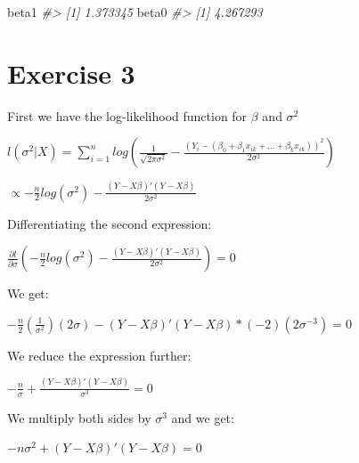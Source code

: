 \documentclass[]{article}
\newenvironment{Shaded}{\begin{snugshade}}{\end{snugshade}}
\newcommand{\CommentTok}[1]{\textcolor[rgb]{0.56,0.35,0.01}{\textit{#1}}}
\newcommand{\KeywordTok}[1]{\textcolor[rgb]{0.13,0.29,0.53}{\textbf{#1}}}
\newcommand{\NormalTok}[1]{#1}
\newcommand{\OperatorTok}[1]{\textcolor[rgb]{0.81,0.36,0.00}{\textbf{#1}}}
\newcommand{\StringTok}[1]{\textcolor[rgb]{0.31,0.60,0.02}{#1}}
\begin{document}
\begin{Shaded}
\end{Shaded}

\begin{Shaded}
\begin{Highlighting}[]
\NormalTok{beta1}
\CommentTok{#> [1] 1.373345}
\NormalTok{beta0}
\CommentTok{#> [1] 4.267293}
\end{Highlighting}
\end{Shaded}

\hypertarget{exercise-3}{%
\section{Exercise 3}\label{exercise-3}}

First we have the log-likelihood function for \(\beta\) and
\(\sigma^{2}\)

\(l(\sigma^{2} | X) = \sum_{i=1}^n log(\frac{1}{\sqrt{2 \pi \sigma^{2}}} - \frac{(Y_{i} - (\beta_{0} + \beta_{1} x_{ik} + \dots + \beta_{k} x_{ik}))^{2}}{2 \sigma^{2}})\)

\(\propto - \frac{n}{2} log(\sigma^{2}) - \frac{(Y - X \beta) \prime (Y - X \beta)}{2 \sigma^{2}}\)

Differentiating the second expression:

\(\frac{\partial l}{\partial \sigma} ( - \frac{n}{2} log(\sigma^{2}) - \frac{(Y - X \beta) \prime (Y - X \beta)}{2 \sigma^{2}}) = 0\)

We get:

\(- \frac{n}{2} (\frac{1}{ \sigma^{2}} ) (2 \sigma) - (Y - X \beta) \prime (Y - X \beta) * (-2)(2 \sigma^{-3}) = 0\)

We reduce the expression further:

\(- \frac{n}{\sigma} + \frac{(Y - X \beta) \prime (Y - X \beta)}{\sigma^{3}} = 0\)

We multiply both sides by \(\sigma^{3}\) and we get:

\(- n \sigma^{2} + (Y - X \beta) \prime (Y - X \beta) = 0\)
\end{document}
